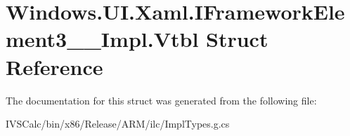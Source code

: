 \hypertarget{struct_windows_1_1_u_i_1_1_xaml_1_1_i_framework_element3_____impl_1_1_vtbl}{}\section{Windows.\+U\+I.\+Xaml.\+I\+Framework\+Element3\+\_\+\+\_\+\+Impl.\+Vtbl Struct Reference}
\label{struct_windows_1_1_u_i_1_1_xaml_1_1_i_framework_element3_____impl_1_1_vtbl}


The documentation for this struct was generated from the following file\+:\begin{DoxyCompactItemize}
\item 
I\+V\+S\+Calc/bin/x86/\+Release/\+A\+R\+M/ilc/Impl\+Types.\+g.\+cs\end{DoxyCompactItemize}
